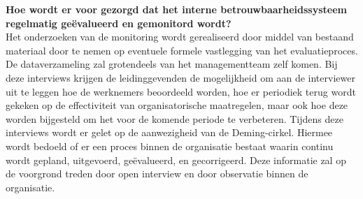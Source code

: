\bigskip \noindent
\textbf{Hoe wordt er voor gezorgd dat het interne betrouwbaarheidssysteem regelmatig geëvalueerd en gemonitord wordt?} \\
Het onderzoeken van de monitoring wordt gerealiseerd door middel van bestaand materiaal door te nemen op eventuele formele vastlegging van het evaluatieproces. De dataverzameling zal grotendeels van het managementteam zelf komen. Bij deze interviews krijgen de leidinggevenden de mogelijkheid om aan de interviewer uit te leggen hoe de werknemers beoordeeld worden, hoe er periodiek terug wordt gekeken op de effectiviteit van organisatorische maatregelen, maar ook hoe deze worden bijgesteld om het voor de komende periode te verbeteren. Tijdens deze interviews wordt er gelet op de aanwezigheid van de Deming-cirkel. Hiermee wordt bedoeld of er een proces binnen de organisatie bestaat waarin continu wordt gepland, uitgevoerd, geëvalueerd, en gecorrigeerd. Deze informatie zal op de voorgrond treden door open interview en door observatie binnen de organisatie.